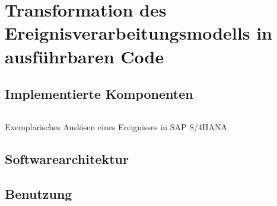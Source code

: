 \section{Transformation des Ereignisverarbeitungsmodells in ausführbaren Code}\label{sec:Transformation}


\subsection{Implementierte Komponenten}

\begin{algorithm}[H]
\centering 
\inputminted[linenos]{ABAP}{code/RaiseEvent.abap}
\caption{Exemplarisches Auslösen eines Ereignisses in SAP S/4HANA}
\end{algorithm}



\subsection{Softwarearchitektur}


\subsection{Benutzung}


